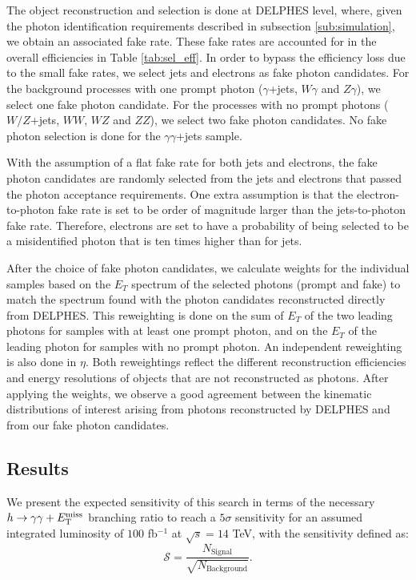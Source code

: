 The object reconstruction and selection is done at DELPHES level, where, given the photon identification requirements described in subsection \ref{sub:simulation}, we obtain an associated fake rate. These fake rates are accounted for in the overall efficiencies in Table \ref{tab:sel_eff}. In order to bypass the efficiency loss due to the small fake rates, we select jets and electrons as fake photon candidates. For the background processes with one prompt photon ($\gamma$+jets, $W\gamma$ and $Z\gamma$), we select one fake photon candidate. For the processes with no prompt photons ($W/Z$+jets, $WW$, $WZ$ and $ZZ$), we select two fake photon candidates. No fake photon selection is done for the $\gamma\gamma$+jets sample.

With the assumption of a flat fake rate for both jets and electrons, the fake photon candidates are randomly selected from the jets and electrons that passed the photon acceptance requirements. One extra assumption is that the electron-to-photon fake rate is set to be order of magnitude larger than the jets-to-photon fake rate. Therefore, electrons are set to have a probability of being selected to be a misidentified photon that is ten times higher than for jets.

After the choice of fake photon candidates, we calculate weights for the individual samples based on the $E_{T}$ spectrum of the selected photons (prompt and fake) to match the spectrum found with the photon candidates reconstructed directly from DELPHES. This reweighting is done on the sum of $E_{T}$ of the two leading photons for samples with at least one prompt photon, and on the $E_{T}$ of the leading photon for samples with no prompt photon. An independent reweighting is also done in $\eta$. Both reweightings reflect the different reconstruction efficiencies and energy resolutions of objects that are not reconstructed as photons. After applying the weights, we observe a good agreement between the kinematic distributions of interest arising from photons reconstructed by DELPHES and from our fake photon candidates.

\subsection{Results}

We present the expected sensitivity of this search in terms of the necessary $h\rightarrow\gamma\gamma+E_{\mathrm{T}}^{\text{miss}}$ branching ratio to reach a $5\sigma$ sensitivity for an assumed integrated luminosity of $100$ fb$^{-1}$ at $\sqrt{s} = 14$ TeV, with the sensitivity defined as:
%
\begin{equation}
\mathcal{S} = \frac{N_\text{Signal}}{\sqrt{N_\text{Background}}}.
\end{equation}


